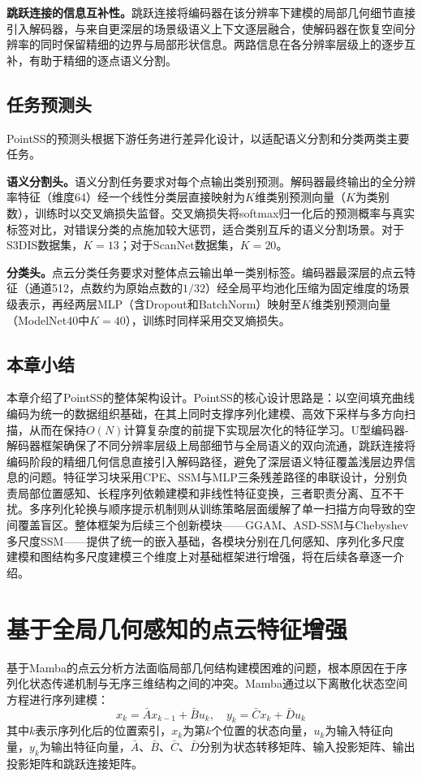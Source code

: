 \documentclass[12pt,a4paper,openany,oneside]{ctexbook}
\theoremstyle{definition}
\theoremstyle{remark}
\begin{document}
\textbf{跳跃连接的信息互补性。}跳跃连接将编码器在该分辨率下建模的局部几何细节直接引入解码器，与来自更深层的场景级语义上下文逐层融合，使解码器在恢复空间分辨率的同时保留精细的边界与局部形状信息。两路信息在各分辨率层级上的逐步互补，有助于精细的逐点语义分割。

\section{任务预测头}

PointSS的预测头根据下游任务进行差异化设计，以适配语义分割和分类两类主要任务。

\textbf{语义分割头。}语义分割任务要求对每个点输出类别预测。解码器最终输出的全分辨率特征（维度64）经一个线性分类层直接映射为$K$维类别预测向量（$K$为类别数），训练时以交叉熵损失监督。交叉熵损失将softmax归一化后的预测概率与真实标签对比，对错误分类的点施加较大惩罚，适合类别互斥的语义分割场景。对于S3DIS数据集，$K=13$；对于ScanNet数据集，$K=20$。

\textbf{分类头。}点云分类任务要求对整体点云输出单一类别标签。编码器最深层的点云特征（通道512，点数约为原始点数的$1/32$）经全局平均池化压缩为固定维度的场景级表示，再经两层MLP（含Dropout和BatchNorm）映射至$K$维类别预测向量（ModelNet40中$K=40$），训练时同样采用交叉熵损失。

\section{本章小结}

本章介绍了PointSS的整体架构设计。PointSS的核心设计思路是：以空间填充曲线编码为统一的数据组织基础，在其上同时支撑序列化建模、高效下采样与多方向扫描，从而在保持$O(N)$计算复杂度的前提下实现层次化的特征学习。U型编码器-解码器框架确保了不同分辨率层级上局部细节与全局语义的双向流通，跳跃连接将编码阶段的精细几何信息直接引入解码路径，避免了深层语义特征覆盖浅层边界信息的问题。特征学习块采用CPE、SSM与MLP三条残差路径的串联设计，分别负责局部位置感知、长程序列依赖建模和非线性特征变换，三者职责分离、互不干扰。多序列化轮换与顺序提示机制则从训练策略层面缓解了单一扫描方向导致的空间覆盖盲区。整体框架为后续三个创新模块——GGAM、ASD-SSM与Chebyshev多尺度SSM——提供了统一的嵌入基础，各模块分别在几何感知、序列化多尺度建模和图结构多尺度建模三个维度上对基础框架进行增强，将在后续各章逐一介绍。

\chapter{基于全局几何感知的点云特征增强}
基于Mamba的点云分析方法面临局部几何结构建模困难的问题，根本原因在于序列化状态传递机制与无序三维结构之间的冲突。Mamba通过以下离散化状态空间方程进行序列建模：
\begin{equation}
	x_k = \bar{A}x_{k-1} + \bar{B}u_k, \quad y_k = \bar{C}x_k + \bar{D}u_k
\end{equation}
其中$k$表示序列化后的位置索引，$x_k$为第$k$个位置的状态向量，$u_k$为输入特征向量，$y_k$为输出特征向量，$\bar{A}$、$\bar{B}$、$\bar{C}$、$\bar{D}$分别为状态转移矩阵、输入投影矩阵、输出投影矩阵和跳跃连接矩阵。
\end{document}
